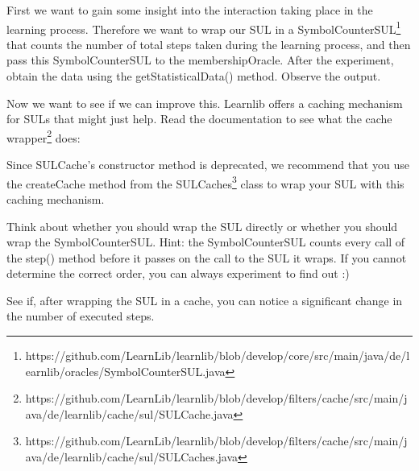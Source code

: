 \documentclass[a4paper]{article}
\begin{document}
First we want to gain some insight into the interaction taking place in the learning process. Therefore we want to wrap our SUL in a SymbolCounterSUL\footnote{https://github.com/LearnLib/learnlib/blob/develop/core/src/main/java/de/learnlib/oracles/SymbolCounterSUL.java} that counts the number of total steps taken during the learning process, and then pass this SymbolCounterSUL to the membershipOracle. After the experiment, obtain the data using the getStatisticalData() method. Observe the output.

Now we want to see if we can improve this. Learnlib offers a caching mechanism for SULs that might just help. Read the documentation to see what the cache wrapper\footnote{https://github.com/LearnLib/learnlib/blob/develop/filters/cache/src/main/java/de/learnlib/cache/sul/SULCache.java} does:


Since SULCache's constructor method is deprecated, we recommend that you use the createCache method from the SULCaches\footnote{https://github.com/LearnLib/learnlib/blob/develop/filters/cache/src/main/java/de/learnlib/cache/sul/SULCaches.java} class to wrap your SUL with this caching mechanism. 


Think about whether you should wrap the SUL directly or whether you should wrap the SymbolCounterSUL. Hint: the SymbolCounterSUL counts every call of the step() method before it passes on the call to the SUL it wraps. If you cannot determine the correct order, you can always experiment to find out :)

See if, after wrapping the SUL in a cache, you can notice a significant change in the number of executed steps.
\end{document}
